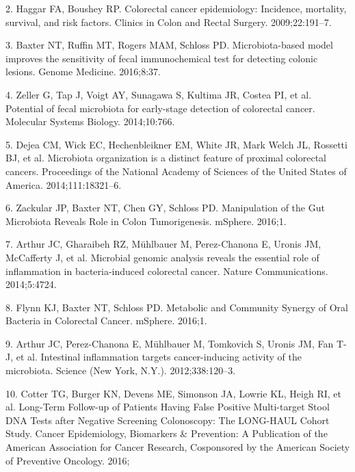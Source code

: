\documentclass[12pt,]{article}
\begin{document}
\hypertarget{ref-haggar_colorectal_2009}{}
2. Haggar FA, Boushey RP. Colorectal cancer epidemiology: Incidence,
mortality, survival, and risk factors. Clinics in Colon and Rectal
Surgery. 2009;22:191--7.

\hypertarget{ref-baxter_microbiota-based_2016}{}
3. Baxter NT, Ruffin MT, Rogers MAM, Schloss PD. Microbiota-based model
improves the sensitivity of fecal immunochemical test for detecting
colonic lesions. Genome Medicine. 2016;8:37.

\hypertarget{ref-zeller_potential_2014}{}
4. Zeller G, Tap J, Voigt AY, Sunagawa S, Kultima JR, Costea PI, et al.
Potential of fecal microbiota for early-stage detection of colorectal
cancer. Molecular Systems Biology. 2014;10:766.

\hypertarget{ref-dejea_microbiota_2014}{}
5. Dejea CM, Wick EC, Hechenbleikner EM, White JR, Mark Welch JL,
Rossetti BJ, et al. Microbiota organization is a distinct feature of
proximal colorectal cancers. Proceedings of the National Academy of
Sciences of the United States of America. 2014;111:18321--6.

\hypertarget{ref-zackular_manipulation_2016}{}
6. Zackular JP, Baxter NT, Chen GY, Schloss PD. Manipulation of the Gut
Microbiota Reveals Role in Colon Tumorigenesis. mSphere. 2016;1.

\hypertarget{ref-arthur_microbial_2014}{}
7. Arthur JC, Gharaibeh RZ, Mühlbauer M, Perez-Chanona E, Uronis JM,
McCafferty J, et al. Microbial genomic analysis reveals the essential
role of inflammation in bacteria-induced colorectal cancer. Nature
Communications. 2014;5:4724.

\hypertarget{ref-flynn_metabolic_2016}{}
8. Flynn KJ, Baxter NT, Schloss PD. Metabolic and Community Synergy of
Oral Bacteria in Colorectal Cancer. mSphere. 2016;1.

\hypertarget{ref-arthur_intestinal_2012}{}
9. Arthur JC, Perez-Chanona E, Mühlbauer M, Tomkovich S, Uronis JM, Fan
T-J, et al. Intestinal inflammation targets cancer-inducing activity of
the microbiota. Science (New York, N.Y.). 2012;338:120--3.

\hypertarget{ref-cotter_long-term_2016}{}
10. Cotter TG, Burger KN, Devens ME, Simonson JA, Lowrie KL, Heigh RI,
et al. Long-Term Follow-up of Patients Having False Positive
Multi-target Stool DNA Tests after Negative Screening Colonoscopy: The
LONG-HAUL Cohort Study. Cancer Epidemiology, Biomarkers \& Prevention: A
Publication of the American Association for Cancer Research, Cosponsored
by the American Society of Preventive Oncology. 2016;
\end{document}
